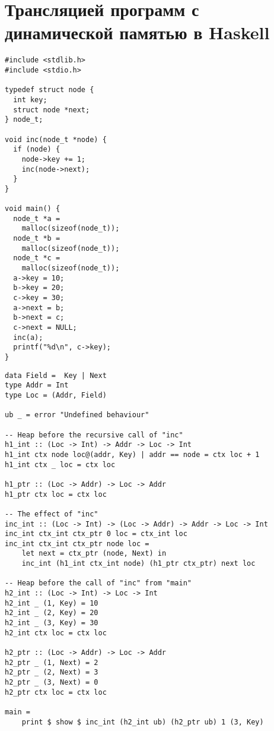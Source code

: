 \newpage
\section{Трансляцией программ с динамической памятью в Haskell\protect\footnotemark}\label{apdx:haskell}

\begin{minipage}[t]{.32\textwidth}
\begin{verbatim}
#include <stdlib.h>
#include <stdio.h>

typedef struct node {
  int key;
  struct node *next;
} node_t;

void inc(node_t *node) {
  if (node) {
    node->key += 1;
    inc(node->next);
  }
}

void main() {
  node_t *a =
    malloc(sizeof(node_t));
  node_t *b =
    malloc(sizeof(node_t));
  node_t *c =
    malloc(sizeof(node_t));
  a->key = 10;
  b->key = 20;
  c->key = 30;
  a->next = b;
  b->next = c;
  c->next = NULL;
  inc(a);
  printf("%d\n", c->key);
}
\end{verbatim}
\end{minipage}
\begin{minipage}[t]{.6\textwidth}
\begin{verbatim}
data Field =  Key | Next
type Addr = Int
type Loc = (Addr, Field)

ub _ = error "Undefined behaviour"

-- Heap before the recursive call of "inc"
h1_int :: (Loc -> Int) -> Addr -> Loc -> Int
h1_int ctx node loc@(addr, Key) | addr == node = ctx loc + 1
h1_int ctx _ loc = ctx loc

h1_ptr :: (Loc -> Addr) -> Loc -> Addr
h1_ptr ctx loc = ctx loc

-- The effect of "inc"
inc_int :: (Loc -> Int) -> (Loc -> Addr) -> Addr -> Loc -> Int
inc_int ctx_int ctx_ptr 0 loc = ctx_int loc
inc_int ctx_int ctx_ptr node loc =
    let next = ctx_ptr (node, Next) in
    inc_int (h1_int ctx_int node) (h1_ptr ctx_ptr) next loc

-- Heap before the call of "inc" from "main"
h2_int :: (Loc -> Int) -> Loc -> Int
h2_int _ (1, Key) = 10
h2_int _ (2, Key) = 20
h2_int _ (3, Key) = 30
h2_int ctx loc = ctx loc

h2_ptr :: (Loc -> Addr) -> Loc -> Addr
h2_ptr _ (1, Next) = 2
h2_ptr _ (2, Next) = 3
h2_ptr _ (3, Next) = 0
h2_ptr ctx loc = ctx loc

main =
    print $ show $ inc_int (h2_int ub) (h2_ptr ub) 1 (3, Key)
\end{verbatim}
\end{minipage}\\[3em]
